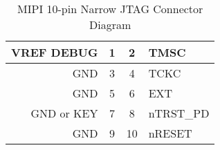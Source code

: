 \begin{table}[htp]
    \centering
    \caption{MIPI 10-pin Narrow JTAG Connector Diagram}
    \label{tab:mipicjtag}
    \begin{tabular}{|r|c|c|l|}
        \hline
        VREF DEBUG & 1 & 2 & TMSC \\
        \hline
        GND & 3 & 4 & TCKC \\
        \hline
        GND & 5 & 6 & EXT \\
        \hline
        GND or KEY & 7 & 8 & nTRST\_PD \\
        \hline
        GND & 9 & 10 & nRESET \\
        \hline
    \end{tabular}
\end{table}
